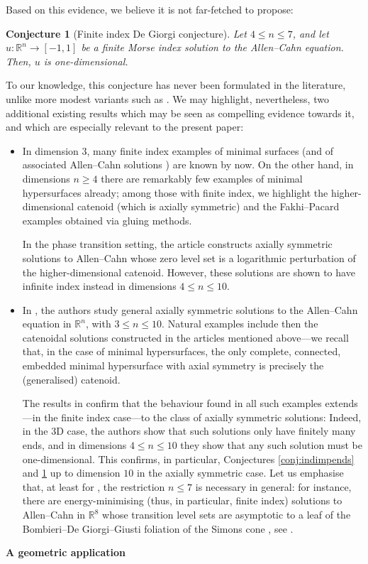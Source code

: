 \documentclass{article}
\newcommand{\R}{\mathbb{R}}
\newtheorem{lconjecture}{Conjecture} %
\theoremstyle{definition}
\begin{document}
Based on this evidence, we believe it is not far-fetched to propose:
\begin{lconjecture}[Finite index De Giorgi conjecture]\label{conj:indclasnogrowth}
    Let $4\leq n\leq 7$, and let $u:\R^n\to[-1,1]$ be a finite Morse index solution to the Allen--Cahn equation. Then, $u$ is one-dimensional.
\end{lconjecture}
To our knowledge, this conjecture has never been formulated in the literature, unlike more modest variants such as . We may highlight, nevertheless, two additional existing results which may be seen as compelling evidence towards it, and which are especially relevant to the present paper:
\begin{itemize}
    \item In dimension $3$, many finite index examples of minimal surfaces (and of associated Allen--Cahn solutions \cite{dPKW13, AdPW15, GuiLiuWei}) are known by now. On the other hand, in dimensions $n\geq 4$ there are remarkably few examples of minimal hypersurfaces already; among those with finite index, we highlight the higher-dimensional catenoid (which is axially symmetric) and the Fakhi--Pacard examples \cite{FP00} obtained via gluing methods.
    
    In the phase transition setting, the article \cite{AdPW16} constructs axially symmetric solutions to Allen--Cahn whose zero level set is a logarithmic perturbation of the higher-dimensional catenoid. However, these solutions are shown to have infinite index instead in dimensions $4\leq n\leq 10$.
    
    \item In \cite{GuiWangWei2020}, the authors study  general axially symmetric solutions to the Allen--Cahn equation in $\R^n$, with $3\leq n \leq 10$. Natural examples include then the catenoidal solutions constructed in the articles mentioned above---we recall that, in the case of minimal hypersurfaces, the only complete, connected, embedded minimal hypersurface with axial symmetry is precisely the (generalised) catenoid.
    
    The results in \cite{GuiWangWei2020} confirm that the behaviour found in all such examples extends---in the finite index case---to the class of axially symmetric solutions: Indeed, in the 3D case, the authors show that such solutions only have finitely many ends, and in dimensions $4\leq n\leq 10$ they show that any such solution must be one-dimensional. This confirms, in particular, Conjectures \ref{conj:indimpends} and \ref{conj:indclasnogrowth} up to dimension $10$ in the axially symmetric case. Let us emphasise that, at least for , the restriction $n\leq 7$ is necessary in general: for instance, there are energy-minimising (thus, in particular, finite index) solutions to Allen--Cahn in $\R^8$ whose transition level sets are asymptotic to a leaf of the Bombieri--De Giorgi--Giusti foliation of the Simons cone \cite{Simons68, BDGG69}, see \cite{PW13, LWW17b}.
\end{itemize}
{\bf A geometric application}
\end{document}
